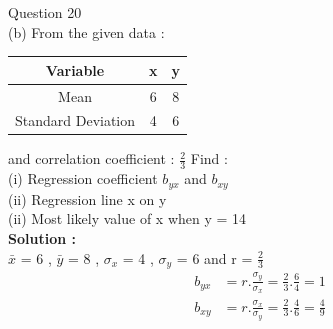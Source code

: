 \documentclass[journal,12pt,twocolumn]{IEEEtran}
\begin{document}

Question 20\\

(b)	From the given data :\\

\begin{table}[h!]
\center
{
\begin{tabular}{|c|c|c|}
\hline
Variable & x & y\\
\hline
Mean & 6 & 8\\
\hline
 Standard Deviation & 4 & 6\\
 \hline
\end{tabular}
}
\end{table}
and correlation coefficient : $\frac{2}{3}$  Find :\\
(i)	 Regression coefficient $ b_{yx} $ and $b_{xy}$\\
(ii) Regression line x on y\\
(ii) Most likely value of x when y = 14\\
\textbf{ Solution : }\\
$\bar{x}$ = 6 , $\bar{y}$ = 8 , $\sigma_{x}$ = 4 , $\sigma_{y}$ = 6 and r = $\frac{2}{3}$\\
\begin{align}
b_{yx} &= r.\frac{\sigma_{y}}{\sigma_{x}}
        = \frac{2}{3}.\frac{6}{4}
        = 1\\
b_{xy} &= r.\frac{\sigma_{x}}{\sigma_{y}}
        = \frac{2}{3}.\frac{4}{6}
        = \frac{4}{9}
\end{align}
\end{document}
